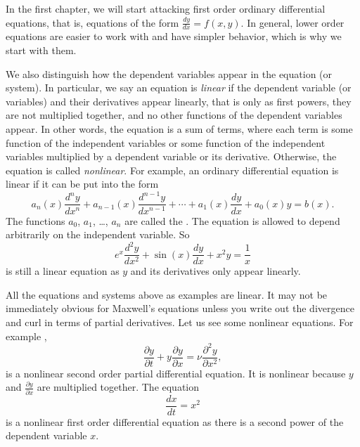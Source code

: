 In the first chapter, we will start attacking first order ordinary
differential equations, that is, equations of the form $\frac{dy}{dx} = f(x,y)$.
In general, lower order equations are easier to work with and have simpler
behavior, which is why we start with them.

\medskip

We also distinguish how the dependent variables appear in the equation (or
system).  In particular, we say an equation is
\emph{linear} if the
dependent variable (or variables) and their derivatives appear linearly,
that is only as first powers, they are not multiplied together, and no other functions of the dependent
variables appear.  In other words, the equation is a sum of terms,
where each term is
some function of the independent variables
or 
some function of the independent variables
multiplied by a dependent variable
or its derivative.
Otherwise, the equation is called
\emph{nonlinear}.
For example,
an ordinary differential equation is linear if it can be
put into the form
\begin{equation} \label{classification:eqlingen}
a_n(x) \frac{d^n y}{dx^n} + 
a_{n-1}(x) \frac{d^{n-1} y}{dx^{n-1}} + 
\cdots
+
a_{1}(x) \frac{dy}{dx}
+
a_{0}(x) y = b(x) .
\end{equation}
The functions $a_0$, $a_1$, \ldots, $a_n$ are called the
\emph{}.
The equation is allowed to depend arbitrarily on the independent variable.
So 
\begin{equation} \label{classification:eqlinex}
e^x \frac{d^2 y}{dx^2} + 
\sin(x) \frac{d y}{dx} + 
x^2 y
=
\frac{1}{x}
\end{equation}
is still a linear equation as $y$ and its derivatives only appear linearly.

All the equations and systems above as examples are linear.  
It may not be immediately obvious for Maxwell's equations unless you write out
the divergence and curl in terms of partial derivatives.  Let us see some
nonlinear equations.  For example ,
\begin{equation*}
\frac{\partial y}{\partial t} + 
y \frac{\partial y}{\partial x} =
\nu \frac{\partial^2 y}{\partial x^2} ,
\end{equation*}
is a nonlinear second order partial differential equation.  It is nonlinear
because $y$ and $\frac{\partial y}{\partial x}$ are multiplied together.
The equation
\begin{equation} \label{classification:eqnonlinode}
\frac{dx}{dt} = x^2
\end{equation}
is a nonlinear first order differential equation as there is a second power of
the dependent variable $x$.

